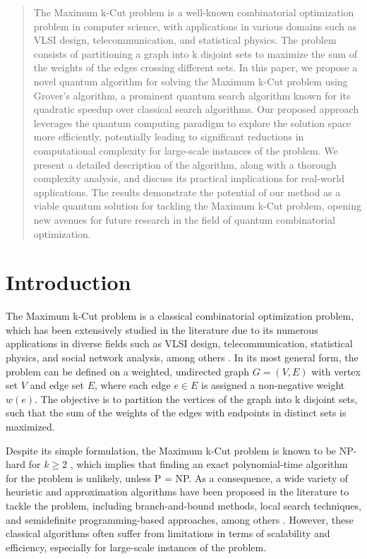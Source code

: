 \begin{abstract}

The Maximum k-Cut problem is a well-known combinatorial optimization problem in computer science, with applications in various domains such as VLSI design, telecommunication, and statistical physics. The problem consists of partitioning a graph into k disjoint sets to maximize the sum of the weights of the edges crossing different sets. In this paper, we propose a novel quantum algorithm for solving the Maximum k-Cut problem using Grover's algorithm, a prominent quantum search algorithm known for its quadratic speedup over classical search algorithms. Our proposed approach leverages the quantum computing paradigm to explore the solution space more efficiently, potentially leading to significant reductions in computational complexity for large-scale instances of the problem. We present a detailed description of the algorithm, along with a thorough complexity analysis, and discuss its practical implications for real-world applications. The results demonstrate the potential of our method as a viable quantum solution for tackling the Maximum k-Cut problem, opening new avenues for future research in the field of quantum combinatorial optimization.

\end{abstract}

\section{Introduction}

The Maximum k-Cut problem is a classical combinatorial optimization problem, which has been extensively studied in the literature due to its numerous applications in diverse fields such as VLSI design, telecommunication, statistical physics, and social network analysis, among others \cite{barahona1992maximum, chopra1994partition, karp1972reducibility}. In its most general form, the problem can be defined on a weighted, undirected graph $G = (V, E)$ with vertex set $V$ and edge set $E$, where each edge $e \in E$ is assigned a non-negative weight $w(e)$. The objective is to partition the vertices of the graph into k disjoint sets, such that the sum of the weights of the edges with endpoints in distinct sets is maximized.

Despite its simple formulation, the Maximum k-Cut problem is known to be NP-hard for $k \geq 2$ \cite{karp1972reducibility}, which implies that finding an exact polynomial-time algorithm for the problem is unlikely, unless P = NP. As a consequence, a wide variety of heuristic and approximation algorithms have been proposed in the literature to tackle the problem, including branch-and-bound methods, local search techniques, and semidefinite programming-based approaches, among others \cite{barahona1992maximum, chopra1994partition, fuerer1997approximation}. However, these classical algorithms often suffer from limitations in terms of scalability and efficiency, especially for large-scale instances of the problem.

